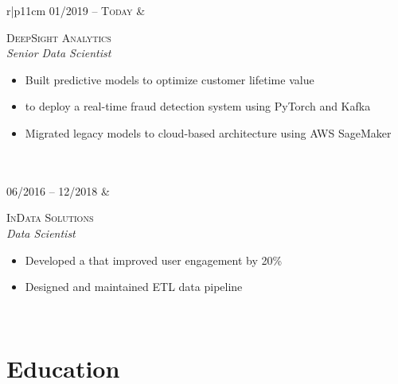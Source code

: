 \documentclass[11pt,a4paper]{article}
\begin{document}
\begin{flushright}
\begin{tabular}{r|p{11cm}}
\textsc{01/2019 -- Today} & \begin{minipage}[t]{\linewidth} \textsc{DeepSight Analytics}\\
\emph{Senior Data Scientist} \\
\vspace{-1\baselineskip}
\begin{itemize}
\tightlist
\item
  Built predictive models to optimize customer lifetime value
\item
  to deploy a real-time fraud detection system using PyTorch and Kafka
\item
  Migrated legacy models to cloud-based architecture using AWS SageMaker
\end{itemize}

   \end{minipage} \\
 \\
\textsc{06/2016 -- 12/2018} & \begin{minipage}[t]{\linewidth} \textsc{InData Solutions}\\
\emph{Data Scientist} \\
\vspace{-1\baselineskip}
\begin{itemize}
\tightlist
\item
  Developed a 
  that improved user engagement by 20\%
\item
  Designed and maintained ETL data pipeline
\end{itemize}

  
 \end{minipage} \\
\end{tabular}
\end{flushright}

\section*{Education}\label{education}
\end{document}

